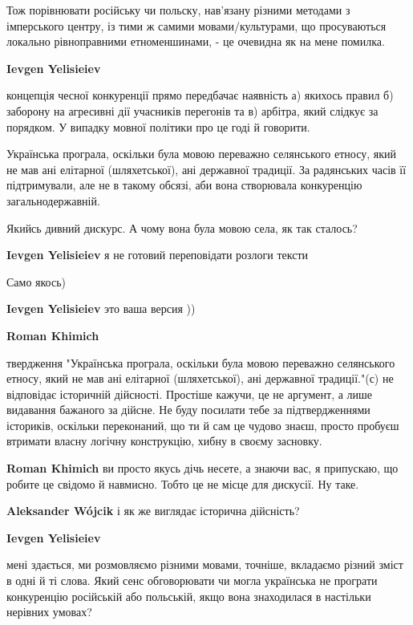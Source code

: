 \begin{itemize}
\begin{itemize}
Тож порівнювати російську чи польску, нав'язану різними методами з імперського
центру, із тими ж самими мовами/культурами, що просуваються локально
рівноправними етноменшинами, - це очевидна як на мене помилка.

\textbf{Ievgen Yelisieiev} 

концепція чесної конкуренції прямо передбачає наявність а) якихось правил б)
заборону на агресивні дії учасників перегонів та в) арбітра, який слідкує за
порядком. У випадку мовної політики про це годі й говорити.

Українська програла, оскільки була мовою переважно селянського етносу, який не
мав ані елітарної (шляхетської), ані державної традиції. За радянських часів її
підтримували, але не в такому обсязі, аби вона створювала конкуренцію
загальнодержавній.


Якийсь дивний дискурс.
А чому вона була мовою села, як так сталось?

\textbf{Ievgen Yelisieiev} я не готовий переповідати розлоги тексти

Само якось)

\textbf{Ievgen Yelisieiev} это ваша версия ))

\textbf{Roman Khimich} 

твердження "Українська програла, оскільки була мовою переважно селянського
етносу, який не мав ані елітарної (шляхетської), ані державної традиції."(с) не
відповідає історичній дійсності. Простіше кажучи, це не аргумент, а лише
видавання бажаного за дійсне. Не буду посилати тебе за підтвердженнями
істориків, оскільки переконаний, що ти й сам це чудово знаєш, просто пробуєш
втримати власну логічну конструкцію, хибну в своєму засновку.


\textbf{Roman Khimich} ви просто якусь дічь несете, а знаючи вас, я припускаю, що робите це свідомо й навмисно. Тобто це не місце для дискусії.
Ну таке.

\textbf{Aleksander Wójcik} і як же виглядає історична дійсність?

\textbf{Ievgen Yelisieiev} 

мені здається, ми розмовляємо різними мовами, точніше, вкладаємо різний зміст в
одні й ті слова. Який сенс обговорювати чи могла українська не програти
конкуренцію російській або польській, якщо вона знаходилася в настільки
нерівних умовах?


\end{itemize}
\end{itemize}
